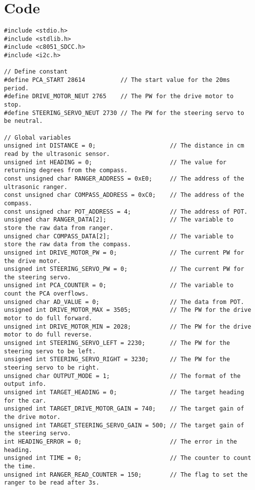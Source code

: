 \documentclass[12pt]{article}
\begin{document}
\section{Code}
\begin{lstlisting}
#include <stdio.h>
#include <stdlib.h>
#include <c8051_SDCC.h>
#include <i2c.h>

// Define constant
#define PCA_START 28614          // The start value for the 20ms period.
#define DRIVE_MOTOR_NEUT 2765    // The PW for the drive motor to stop.
#define STEERING_SERVO_NEUT 2730 // The PW for the steering servo to be neutral.

// Global variables
unsigned int DISTANCE = 0;                     // The distance in cm read by the ultrasonic sensor.
unsigned int HEADING = 0;                      // The value for returning degrees from the compass.
const unsigned char RANGER_ADDRESS = 0xE0;     // The address of the ultrasonic ranger.
const unsigned char COMPASS_ADDRESS = 0xC0;    // The address of the compass.
const unsigned char POT_ADDRESS = 4;           // The address of POT.
unsigned char RANGER_DATA[2];                  // The variable to store the raw data from ranger.
unsigned char COMPASS_DATA[2];                 // The variable to store the raw data from the compass.
unsigned int DRIVE_MOTOR_PW = 0;               // The current PW for the drive motor.
unsigned int STEERING_SERVO_PW = 0;            // The current PW for the steering servo.
unsigned int PCA_COUNTER = 0;                  // The variable to count the PCA overflows.
unsigned char AD_VALUE = 0;                    // The data from POT.
unsigned int DRIVE_MOTOR_MAX = 3505;           // The PW for the drive motor to do full forward.
unsigned int DRIVE_MOTOR_MIN = 2028;           // The PW for the drive motor to do full reverse.
unsigned int STEERING_SERVO_LEFT = 2230;       // The PW for the steering servo to be left.
unsigned int STEERING_SERVO_RIGHT = 3230;      // The PW for the steering servo to be right.
unsigned char OUTPUT_MODE = 1;                 // The format of the output info.
unsigned int TARGET_HEADING = 0;               // The target heading for the car.
unsigned int TARGET_DRIVE_MOTOR_GAIN = 740;    // The target gain of the drive motor.
unsigned int TARGET_STEERING_SERVO_GAIN = 500; // The target gain of the steering servo.
int HEADING_ERROR = 0;                         // The error in the heading.
unsigned int TIME = 0;                         // The counter to count the time.
unsigned int RANGER_READ_COUNTER = 150;        // The flag to set the ranger to be read after 3s.


\end{lstlisting}
\end{document}
